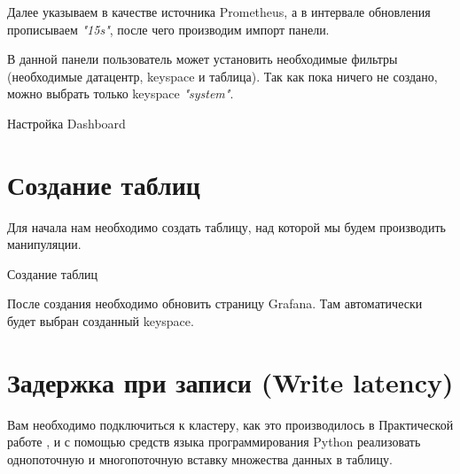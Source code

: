 Далее указываем в качестве источника Prometheus, а в интервале
обновления прописываем \textit{"15s"}, после чего производим импорт панели.\par
В данной панели пользователь может установить необходимые фильтры
(необходимые датацентр, keyspace и таблица). Так как пока ничего не создано,
можно выбрать только keyspace \textit{"system"}.

\begin{image}
	\caption{Настройка Dashboard}
	\label{fig:dashboard:setting}
\end{image}

\section{Создание таблиц}

Для начала нам необходимо создать таблицу, над которой мы будем
производить манипуляции.

\begin{image}
	\caption{Создание таблиц}
	\label{fig:keyspace}
\end{image}

После создания необходимо обновить страницу Grafana. Там
автоматически будет выбран созданный keyspace.

\section{Задержка при записи (Write latency)}

Вам необходимо подключиться к кластеру, как это производилось в
Практической работе , и с помощью средств языка программирования Python
реализовать однопоточную и многопоточную вставку множества данных в
таблицу.

